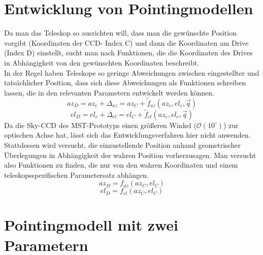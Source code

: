 \section{Entwicklung von Pointingmodellen}
Da man das Teleskop so ausrichten will, dass man die gewünschte Position vorgibt (Koordinaten der CCD- Index C) und dann die Koordinaten am Drive (Index D) einstellt, sucht man nach Funktionen, die die Koordinaten des Drives in Abhängigkeit von den gewünschten Koordinaten beschreibt. \\
In der Regel haben Teleskope so geringe Abweichungen zwischen eingestellter und tatsächlicher Position, dass sich diese Abweichungen als Funktionen schreiben lassen, die in den relevanten Parametern entwickelt werden können.
\begin{equation}
az_D=az_c+\Delta_{az}=az_C+\tilde{f}_{az}\left(az_c,el_c,\vec{q}\right)
\end{equation}
\begin{equation}
el_D=el_c+\Delta_{el}=el_C+\tilde{f}_{el}\left(az_c,el_c,\vec{q}\right)
\label{eq:pointingZero}
\end{equation}
Da die Sky-CCD des MST-Prototyps einen größeren Winkel ($\mathcal{O}\left(10^{\circ}\right)$) zur optischen Achse hat, lässt sich das Entwicklungsverfahren hier nicht anwenden. Stattdessen wird versucht, die einzustellende Position anhand geometrischer Überlegungen in Abhängigkeit der wahren Position vorherzusagen. Man versucht also Funktionen zu finden, die nur von den wahren Koordinaten und einem teleskopsspezifischen Parametersatz abhängen.
\begin{equation} 
az_D=f_{az}(az_C,el_C)
\end{equation}
\begin{equation}
el_D=f_{el}(az_C,el_C)
\label{eq:pointingprinciple}
\end{equation}

\section{Pointingmodell mit zwei Parametern}
